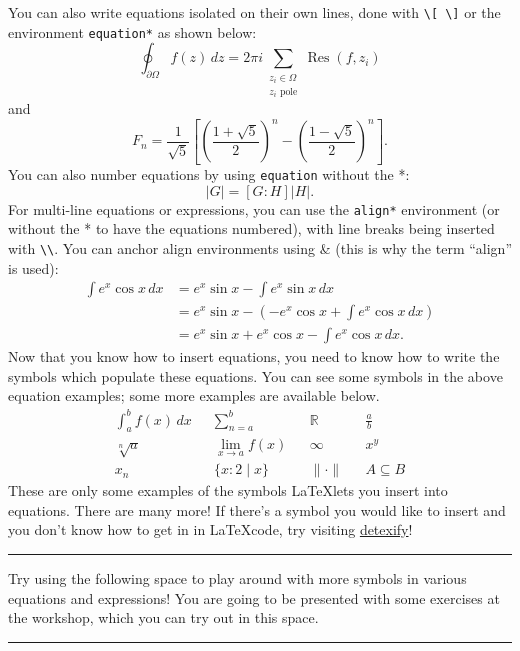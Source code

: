\documentclass{article}
\begin{document}
You can also write equations isolated on their own lines, done with \texttt{\textbackslash[ \textbackslash]} or the environment \texttt{equation*} as shown below:
\[
    \oint_{\partial\Omega} f(z) \, dz=2 \pi i\sum_{\substack{z_i\in\Omega\\z_i\text{ pole}}}\operatorname{Res}(f,z_i)
\]
and
\begin{equation*}
    F_n=\frac{1}{\sqrt{5}}\left[\left(\frac{1+\sqrt{5}}{2}\right)^n-\left(\frac{1-\sqrt{5}}{2}\right)^n\right].
\end{equation*}
You can also number equations by using \texttt{equation} without the *:
\begin{equation}
    |G|=[G:H]|H|.
\end{equation}
For multi-line equations or expressions, you can use the \texttt{align*} environment (or without the * to have the equations numbered), with line breaks being inserted with \texttt{\textbackslash\textbackslash}. You can anchor align environments using \& (this is why the term ``align'' is used):
\begin{align*}
    \int e^x \cos x \, dx &= e^x \sin x-\int e^x \sin x \, dx \\
    &= e^x \sin x - \left(-e^x \cos x + \int e^x \cos x \,dx\right) \\
    &= e^x \sin x + e^x \cos x - \int e^x \cos x \,dx.
\end{align*}
Now that you know how to insert equations, you need to know how to write the symbols which populate these equations. You can see some symbols in the above equation examples; some more examples are available below.
\begin{align*}
    \int_a^b f(x) \,dx && \sum_{n=a}^b && \mathbb{R} && \frac{a}{b} \\
    \sqrt[n]{a} && \lim_{x \to a}f(x) && \infty && x^y \\
    x_n && \{ x : 2 \mid x \} && \lVert \cdot \rVert && A \subseteq B
\end{align*}
These are only some examples of the symbols \LaTeX lets you insert into equations. There are many more! If there's a symbol you would like to insert and you don't know how to get in in \LaTeX code, try visiting \href{https://detexify.kirelabs.org/classify.html}{detexify}!

\noindent\hspace{-2cm}\rule{16cm}{0.4pt} %
\vspace{0.2cm} %

\noindent
Try using the following space to play around with more symbols in various equations and expressions! You are going to be presented with some exercises at the workshop, which you can try out in this space.



\vspace{0.2cm}
\noindent\hspace{-2cm}\rule{16cm}{0.4pt}
\end{document}
